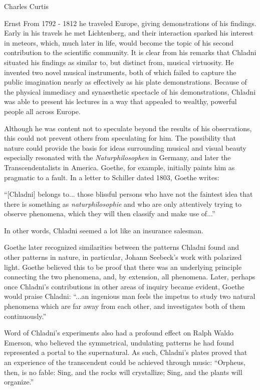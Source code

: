 \documentclass[a4paper,10pt]{report}
\numberwithin{equation}{section}
\begin{document}
\begin{chapter}{Charles Curtis}
\begin{section}{Ernst}
From 1792 - 1812 he traveled Europe, giving demonstrations of his findings.\cite[p.~21]{Stockmann2007} Early in his travels he met Lichtenberg, and their interaction sparked his interest in meteors, which, much later in life, would become the topic of his second contribution to the scientific community.\cite[p.~28]{Ullmann2007} It is clear from his remarks that Chladni situated his findings as similar to, but distinct from, musical virtuosity. He invented two novel musical instruments, both of which failed to capture the public imagination nearly as effectively as his plate demonstrations. Because of the physical immediacy and synaesthetic spectacle of his demonstrations, Chladni was able to present his lectures in a way that appealed to wealthy, powerful people all across Europe. 

Although he was content not to speculate beyond the results of his observations, this could not prevent others from speculating for him.\cite[p.~13]{Bonds2012} The possibility that nature could provide the basis for ideas surrounding musical and visual beauty especially resonated with the \emph{Naturphilosophen} in Germany, and later the Transcendentalists in America.\cite[p.~15]{Bonds2012} Goethe, for example, initially paints him as pragmatic to a fault. In a letter to Schiller dated 1803, Goethe writes: 

``[Chladni] belongs to... those blissful persons who have not the faintest idea that there is something as \emph{naturphilosophie} and who are only attentively trying to observe phenomena, which they will then classify and make use of...''\cite[p.~18]{Stockmann2007}

In other words, Chladni seemed a lot like an insurance salesman.

Goethe later recognized similarities between the patterns Chladni found and other patterns in nature, in particular, Johann Seebeck's work with polarized light. Goethe believed this to be proof that there was an underlying principle connecting the two phenomena, and, by extension, all phenomena.\cite[p.~17]{Bonds2012} Later, perhaps once Chladni's contributions in other areas of inquiry became evident, Goethe would praise Chladni: ``...an ingenious man feels the impetus to study two natural phenomena which are far away from each other, and investigates both of them continuously.''\cite[p.~31]{Ullmann2007}

Word of Chladni's experiments also had a profound effect on Ralph Waldo Emerson, who believed the symmetrical, undulating patterns he had found represented a portal to the supernatural. As such, Chladni's plates proved that an experience of the transcendent could be achieved through music: ``Orpheus, then, is no fable: Sing, and the rocks will crystallize; Sing, and the plants will organize.''\cite[p.~15]{Bonds2012}


\end{section}
\end{chapter}
\end{document}
